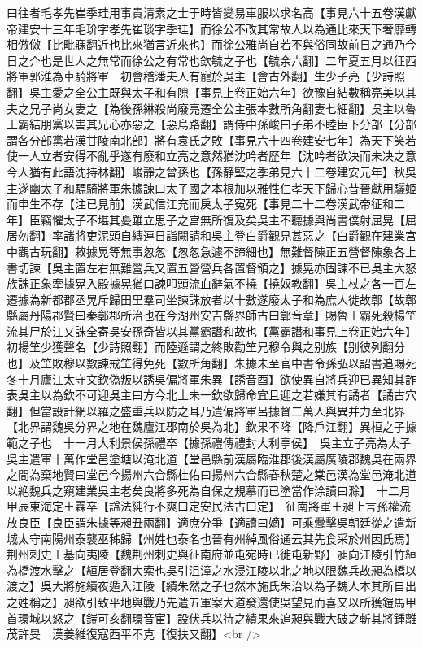 曰往者毛孝先崔季珪用事貴清素之士于時皆變易車服以求名高【事見六十五卷漢獻帝建安十三年毛玠字孝先崔琰字季珪】而徐公不改其常故人以為通比來天下奢靡轉相倣傚【比毗寐翻近也比來猶言近來也】而徐公雅尚自若不與俗同故前日之通乃今日之介也是世人之無常而徐公之有常也欽毓之子也【毓余六翻】二年夏五月以征西將軍郭淮為車騎將軍　初會稽潘夫人有寵於吳主【會古外翻】生少子亮【少詩照翻】吳主愛之全公主既與太子和有隙【事見上卷正始六年】欲豫自結數稱亮美以其夫之兄子尚女妻之【為後孫綝殺尚廢亮遷全公主張本數所角翻妻七細翻】吳主以魯王霸結朋黨以害其兄心亦惡之【惡烏路翻】謂侍中孫峻曰子弟不睦臣下分部【分部謂各分部黨若漢甘陵南北部】將有袁氏之敗【事見六十四卷建安七年】為天下笑若使一人立者安得不亂乎遂有廢和立亮之意然猶沈吟者歷年【沈吟者欲决而未决之意今人猶有此語沈持林翻】峻靜之曾孫也【孫静堅之季弟見六十二卷建安元年】秋吳主遂幽太子和驃騎將軍朱據諫曰太子國之本根加以雅性仁孝天下歸心昔晉獻用驪姬而申生不存【注已見前】漢武信江充而戾太子寃死【事見二十二卷漢武帝征和二年】臣竊懼太子不堪其憂雖立思子之宫無所復及矣吳主不聽據與尚書僕射屈晃【屈居勿翻】率諸將吏泥頭自縳連日詣闕請和吳主登白爵觀見甚惡之【白爵觀在建業宫中觀古玩翻】敕據晃等無事怱怱【怱怱急遽不諦細也】無難督陳正五營督陳象各上書切諫【吳主置左右無難營兵又置五營營兵各置督領之】據晃亦固諫不已吳主大怒族誅正象牽據晃入殿據晃猶口諫叩頭流血辭氣不撓【撓奴教翻】吳主杖之各一百左遷據為新都郡丞晃斥歸田里羣司坐諫誅放者以十數遂廢太子和為庶人徙故鄣【故鄣縣屬丹陽郡賢曰秦鄣郡所治也在今湖州安吉縣界師古曰鄣音章】賜魯王霸死殺楊笁流其尸於江又誅全寄吳安孫奇皆以其黨霸譖和故也【黨霸譖和事見上卷正始六年】初楊笁少獲聲名【少詩照翻】而陸遜謂之終敗勸笁兄穆令與之别族【别彼列翻分也】及笁敗穆以數諫戒笁得免死【數所角翻】朱據未至官中書令孫弘以詔書追賜死　冬十月廬江太守文欽偽叛以誘吳偏將軍朱異【誘音酉】欲使異自將兵迎已異知其詐表吳主以為欽不可迎吳主曰方今北土未一欽欲歸命宜且迎之若嫌其有譎者【譎古穴翻】但當設計網以羅之盛重兵以防之耳乃遣偏將軍呂據督二萬人與異并力至北界【北界謂魏吳分界之地在魏廬江郡南於吳為北】欽果不降【降戶江翻】異桓之子據範之子也　十一月大利景侯孫禮卒【據孫禮傳禮封大利亭侯】　吳主立子亮為太子　吳主遣軍十萬作堂邑塗塘以淹北道【堂邑縣前漢屬臨淮郡後漢屬廣陵郡魏吳在兩界之間為棄地賢曰堂邑今揚州六合縣杜佑曰揚州六合縣春秋楚之棠邑漢為堂邑淹北道以絶魏兵之窺建業吳主老矣良將多死為自保之規摹而已塗當作涂讀曰滁】　十二月甲辰東海定王霖卒【諡法純行不爽曰定安民法古曰定】　征南將軍王昶上言孫權流放良臣【良臣謂朱據等昶丑兩翻】適庶分爭【適讀曰嫡】可乘釁擊吳朝廷從之遣新城太守南陽州泰襲巫秭歸【州姓也泰名也晉有州綽風俗通云其先食采於州因氏焉】荆州刺史王基向夷陵【魏荆州刺史與征南府並屯宛時已徙屯新野】昶向江陵引竹絙為橋渡水擊之【絙居登翻大索也吳引沮漳之水浸江陵以北之地以限魏兵故昶為橋以渡之】吳大將施績夜遁入江陵【績朱然之子也然本施氏朱治以為子魏人本其所自出之姓稱之】昶欲引致平地與戰乃先遣五軍案大道發還使吳望見而喜又以所獲鎧馬甲首環城以怒之【鎧可亥翻環音宦】設伏兵以待之績果來追昶與戰大破之斬其將鍾離茂許旻　漢姜維復寇西平不克【復扶又翻】<br />
